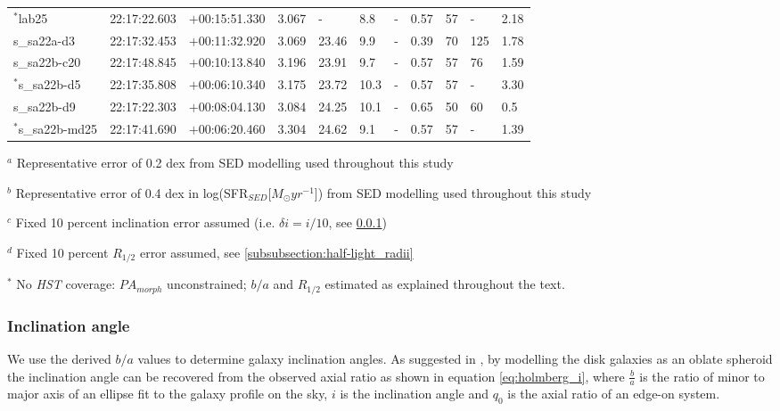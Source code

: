\documentclass[fleqn,usenatbib]{mn2e}
\begin{document}
\begin{table*}
\begin{threeparttable}
\begin{tabular}{lllllllllll}
$^{*}$lab25         & 22:17:22.603 & $+$00:15:51.330 & 3.067      & -    & 8.8  & -            & 0.57         & 57        & -    & 2.18      \\
s\_sa22a-d3   & 22:17:32.453 & $+$00:11:32.920 & 3.069 & 23.46 & 9.9  & -            & 0.39        & 70        & 125   & 1.78      \\
s\_sa22b-c20  & 22:17:48.845 & $+$00:10:13.840 & 3.196     & 23.91 & 9.7  & -            & 0.57        & 57        & 76    & 1.59      \\
$^{*}$s\_sa22b-d5  & 22:17:35.808 & $+$00:06:10.340 & 3.175 & 23.72 & 10.3 & -            & 0.57         & 57        & -    & 3.30      \\
s\_sa22b-d9   & 22:17:22.303 & $+$00:08:04.130 & 3.084    & 24.25 & 10.1 & -            & 0.65        & 50        & 60   & 0.5       \\
$^{*}$s\_sa22b-md25 & 22:17:41.690 & $+$00:06:20.460 & 3.304     & 24.62 & 9.1  & -            & 0.57         & 57        & -    & 1.39      

\end{tabular}
\begin{tablenotes}
      \small
      \item $^{a}$ Representative error of 0.2 dex from SED modelling used throughout this study
      \item $^{b}$ Representative error of 0.4 dex in log(SFR$_{SED}$[$M_{\odot}yr^{-1}$]) from SED modelling used throughout this study
      \item $^{c}$ Fixed 10 percent inclination error assumed (i.e. $\delta i = i / 10$, see \protect\cref{subsubsection:inclination_angle})
      \item $^{d}$ Fixed 10 percent $R_{1/2}$ error assumed, see \protect\cref{subsubsection:half-light_radii}
      \item $^{*}$ No {\em HST} coverage: $PA_{morph}$ unconstrained; $b/a$ and $R_{1/2}$ estimated as explained throughout the text.
    \end{tablenotes}
  \end{threeparttable}
  \end{table*}


\subsubsection{Inclination angle}\label{subsubsection:inclination_angle}
We use the derived $b/a$ values to determine galaxy inclination angles.
As suggested in \cite{Holmberg1958}, by modelling the disk galaxies as an oblate spheroid the inclination angle can be recovered from the observed axial ratio as shown in equation \ref{eq:holmberg_i}, where $\frac{b}{a}$ is the ratio of minor to major axis of an ellipse fit to the galaxy profile on the sky, $i$ is the inclination angle and $q_{0}$ is the axial ratio of an edge-on system.
\end{document}
